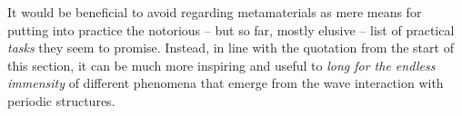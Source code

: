 It would be beneficial to avoid regarding metamaterials as mere means for putting into practice the notorious -- but so far, mostly elusive -- list of practical \textit{tasks} they seem to promise. Instead, in line with the quotation from the start of this section, it can be much more inspiring and useful to \textit{long for the endless immensity} of different phenomena that emerge from the wave interaction with periodic structures.

